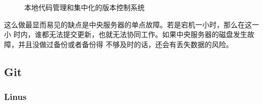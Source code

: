 \documentclass[UTF8,AutoFakeBold]{ctexart}
\begin{document}
\begin{figure}[H] %
    \centering %

    \caption{本地代码管理和集中化的版本控制系统} %
    \label{Fig.svn_interge} %
\end{figure}

这么做最显而易见的缺点是中央服务器的单点故障。若是宕机一小时，那么在这一小
时内，谁都无法提交更新，也就无法协同工作。如果中央服务器的磁盘发生故障，并且没做过备份或者备份得
不够及时的话，还会有丢失数据的风险。


\subsection{Git} %
\label{sub:Git}

\subsubsection{Linus}





\newpage
\end{document}
